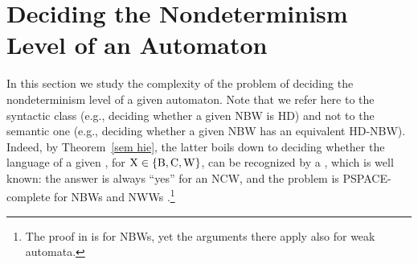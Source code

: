 \documentclass{lmcs}
\begin{document}
\section{Deciding the Nondeterminism Level of an Automaton}

In this section we study the complexity of the problem of deciding the nondeterminism level of a given automaton. Note that we refer here to the syntactic class (e.g., deciding whether a given NBW is HD) and not to the semantic one (e.g., deciding whether a given NBW has an equivalent HD-NBW). Indeed, by Theorem~\ref{sem hie}, the latter boils down to deciding whether the language of a given \nxw, for ${\rm X} \in \{{\rm B,C,W}\}$, can be recognized by a \dxw, which is well known: the answer is always ``yes'' for an NCW, and the problem is PSPACE-complete for NBWs  and NWWs \cite{KV05b}.\footnote{The proof in \cite{KV05b} is for NBWs, yet the arguments there apply also for weak automata.}
 
\end{document}
